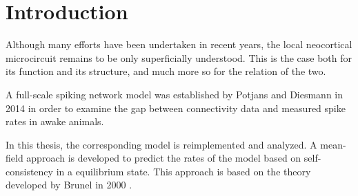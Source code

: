 \section{Introduction}
Although many efforts have been undertaken in recent years, the 
local neocortical microcircuit remains to be only superficially 
understood. This is the case both for its function and its structure, 
and much more so for the relation of the two. 

A full-scale spiking network model was established by Potjans and 
Diesmann \cite{potjans2014} in 2014 in order 
to examine the gap between connectivity data and measured spike rates
in awake animals.

In this thesis, the corresponding model is reimplemented and analyzed. 
A mean-field approach is developed to predict the rates of the model
based on self-consistency in a equilibrium state. This approach is based 
on the theory developed by Brunel in 2000 \cite{brunel2000}. 





